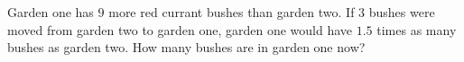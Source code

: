 Garden one has $9$ more red currant bushes than garden two. If $3$ bushes were moved from garden two to garden one, garden one would have $1.5$ times as many bushes as garden two. How many bushes are in garden one now?
